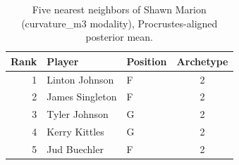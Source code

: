 \begin{table}[htbp]
  \centering\small
  \begin{tabular}{rllc}
    \toprule
    Rank & Player & Position & Archetype \\
    \midrule
    1 & Linton Johnson & F & 2 \\
    2 & James Singleton & F & 2 \\
    3 & Tyler Johnson & G & 2 \\
    4 & Kerry Kittles & G & 2 \\
    5 & Jud Buechler & F & 2 \\
    \bottomrule
  \end{tabular}
  \caption{Five nearest neighbors of Shawn Marion (curvature_m3 modality), Procrustes-aligned posterior mean.}
  \label{tab:Shawn_Marion_neighbors_curvature_m3}
\end{table}

